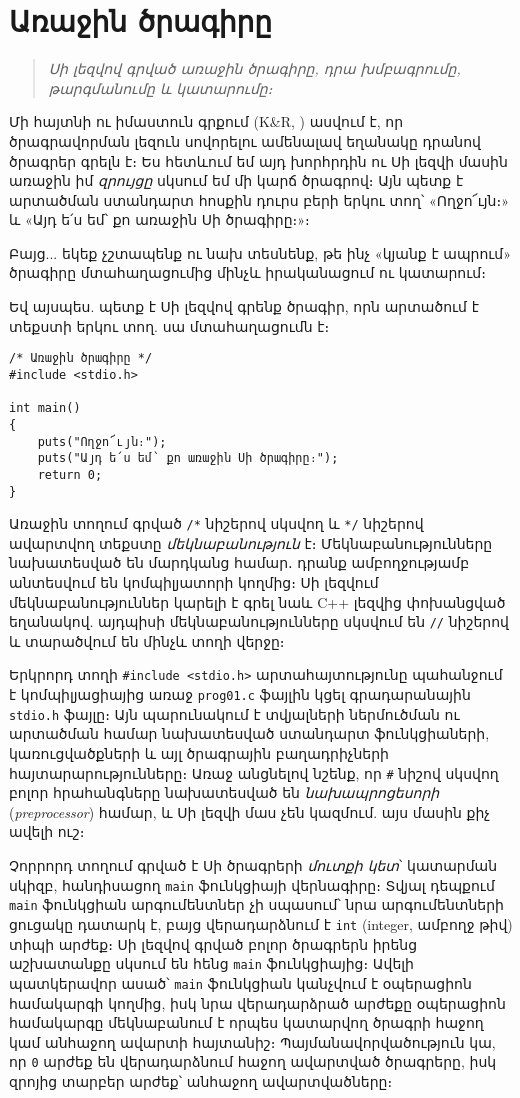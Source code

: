 \chapter{Առաջին ծրագիրը}

\begin{quote}
\emph{Սի լեզվով գրված առաջին ծրագիրը, դրա խմբագրումը, թարգմանումը և կատարումը։}
\end{quote}

Մի հայտնի ու իմաստուն գրքում (K\&R, \cite{krc}) ասվում է, որ ծրագրավորման լեզուն սովորելու ամենալավ եղանակը դրանով ծրագրեր գրելն է։ Ես հետևում եմ այդ խորհրդին ու Սի լեզվի մասին առաջին իմ \emph{զրույցը} սկսում եմ մի կարճ ծրագրով։ Այն պետք է արտածման ստանդարտ հոսքին դուրս բերի երկու տող՝ «Ողջո՜ւյն։» և «Այդ ե՛ս եմ՝ քո առաջին Սի ծրագիրը։»։

Բայց... եկեք չշտապենք ու նախ տեսնենք, թե ինչ «կյանք է ապրում» ծրագիրը մտահաղացումից մինչև իրականացում ու կատարում։

Եվ այսպես. պետք է Սի լեզվով գրենք ծրագիր, որն արտածում է տեքստի երկու տող. սա մտահաղացումն է։

\begin{Verbatim}
/* Առաջին ծրագիրը */
#include <stdio.h>

int main()
{
    puts("Ողջո՜ւյն։");
    puts("Այդ ե՛ս եմ՝ քո առաջին Սի ծրագիրը։");
    return 0;
}
\end{Verbatim}

Առաջին տողում գրված \verb|/*| նիշերով սկսվող և \verb|*/| նիշերով ավարտվող տեքստը \emph{մեկնաբանություն} է։ Մեկնաբանությունները նախատեսված են մարդկանց համար․ դրանք ամբողջությամբ անտեսվում են կոմպիլյատորի կողմից։ Սի լեզվում մեկնաբանություններ կարելի է գրել նաև C++ լեզվից փոխանցված եղանակով. այդպիսի մեկնաբանությունները սկսվում են \verb|//| նիշերով և տարածվում են մինչև տողի վերջը։

Երկրորդ տողի \verb|#include <stdio.h>| արտահայտությունը պահանջում է կոմպիլյացիայից առաջ \texttt{prog01.c} ֆայլին կցել գրադարանային \texttt{stdio.h} ֆայլը։ Այն պարունակում է տվյալների ներմուծման ու արտածման համար նախատեսված ստանդարտ ֆունկցիաների, կառուցվածքների և այլ ծրագրային բաղադրիչների հայտարարությունները։ Առաջ անցնելով նշենք, որ \verb|#| նիշով սկսվող բոլոր հրահանգները նախատեսված են \emph{նախապրոցեսորի} (\emph{preprocessor}) համար, և Սի լեզվի մաս չեն կազմում. այս մասին քիչ ավելի ուշ։

Չորրորդ տողում գրված է Սի ծրագրերի \emph{մուտքի կետ}՝ կատարման սկիզբ, հանդիսացող \texttt{main} ֆունկցիայի վերնագիրը։ Տվյալ դեպքում \texttt{main} ֆունկցիան արգումենտներ չի սպասում՝ նրա արգումենտների ցուցակը դատարկ է, բայց վերադարձնում է \texttt{int} (integer, ամբողջ թիվ) տիպի արժեք։ Սի լեզվով գրված բոլոր ծրագրերն իրենց աշխատանքը սկսում են հենց \texttt{main} ֆունկցիայից։ Ավելի պատկերավոր ասած՝ \texttt{main} ֆունկցիան կանչվում է օպերացիոն համակարգի կողմից, իսկ նրա վերադարձրած արժեքը օպերացիոն համակարգը մեկնաբանում է որպես կատարվող ծրագրի հաջող կամ անհաջող ավարտի հայտանիշ։ Պայմանավորվածություն կա, որ \texttt{0} արժեք են վերադարձնում հաջող ավարտված ծրագրերը, իսկ զրոյից տարբեր արժեք՝ անհաջող ավարտվածները։


